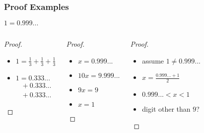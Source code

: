 \documentclass[dvipsnames]{beamer}
\begin{document}
\begin{frame}
  \frametitle{Proof Examples}

  \begin{theorem}
    $1 = 0.999...$
  \end{theorem}

  \pause
  \begin{columns}[t]
    \begin{proof}
      \begin{itemize}
        \item $1 = \frac{1}{3} + \frac{1}{3} + \frac{1}{3}$
        \item $1 = 0.333...$\\
        ~~$+~0.333...$\\
        ~~$+~0.333...$
      \end{itemize}
    \end{proof}

    \pause
    \begin{proof}
      \begin{itemize}
        \item $x = 0.999...$
        \item $10x = 9.999...$
        \item $9x = 9$
        \item $x = 1$
      \end{itemize}
    \end{proof}

    \pause
    \begin{proof}
      \begin{itemize}
        \item assume $1 \neq 0.999...$
        \item $x = \frac{0.999... + 1}{2}$
        \item $0.999... < x < 1$
        \item digit other than $9$?
      \end{itemize}
    \end{proof}
  \end{columns}
\end{frame}
%
%
%
\end{document}
